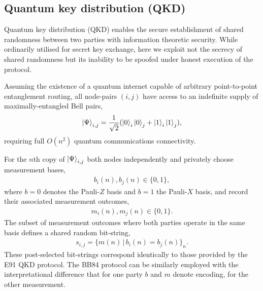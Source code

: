 %

\subsection{Quantum key distribution (QKD)} \label{sec:QKD}

Quantum key distribution (QKD) \cite{BB84, E91} enables the secure establishment of shared randomness between two parties with information theoretic security. While ordinarily utilised for secret key exchange, here we exploit not the secrecy of shared randomness but its inability to be spoofed under honest execution of the protocol.

Assuming the existence of a quantum internet \cite{RohdeQI} capable of arbitrary point-to-point entanglement routing, all node-pairs $(i,j)$ have access to an indefinite supply of maximally-entangled Bell pairs,
\begin{align}
	\ket{\Psi}_{i,j} = \frac{1}{\sqrt{2}}(\ket{0}_i\ket{0}_j+\ket{1}_i\ket{1}_j),
\end{align}
requiring full $O(n^2)$ quantum communications connectivity.

For the $n$th copy of $\ket{\Psi}_{i,j}$ both nodes independently and privately choose measurement bases,
\begin{align}
	b_i(n),b_j(n)\in\{0,1\},
\end{align}
where \mbox{$b=0$} denotes the Pauli-$Z$ basis and $b=1$ the Pauli-$X$ basis, and record their associated measurement outcomes,
\begin{align}
	m_i(n),m_j(n)\in\{0,1\}.
\end{align}
The subset of measurement outcomes where both parties operate in the same basis defines a shared random bit-string,
\begin{align}
	s_{i,j} = \{m(n)\,|\, b_i(n)=b_j(n)\}_n.
\end{align}
These post-selected bit-strings correspond identically to those provided by the E91 \cite{E91} QKD protocol. The BB84 protocol \cite{BB84} can be similarly employed with the interpretational difference that for one party $b$ and $m$ denote encoding, for the other measurement.


